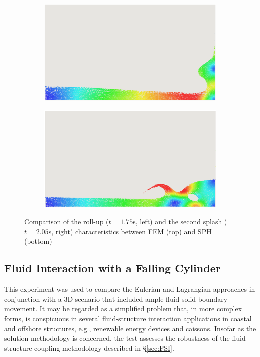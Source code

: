 \begin{figure}[H]
\begin{subfigure}{0.4\columnwidth}
	\end{subfigure}
	\begin{subfigure}{0.4\columnwidth}    
		\centering
		\includegraphics[width=1.0\textwidth]{images/FSI_Comparison/DB_SPH_1.png}
	\end{subfigure}
	\begin{subfigure}{0.4\columnwidth}
		\centering
		\includegraphics[width=1.0\textwidth]{images/FSI_Comparison/DB_SPH_2.png}
	\end{subfigure}
	\caption{Comparison of the roll-up ($t=1.75$\si{s}, left) and the second splash ($t=2.05$\si{s}, right) characteristics between FEM (top) and SPH (bottom)}    
	\label{fig:db_charac_fsi}
\end{figure}

\subsection{Fluid Interaction with a Falling Cylinder}
This experiment was used to compare the Eulerian and Lagrangian approaches in conjunction with a 3D scenario that included ample fluid-solid boundary movement. It may be regarded as a simplified problem that, in more complex forms, is conspicuous in several fluid-structure interaction applications in coastal and offshore structures, e.g., renewable energy devices and caissons. Insofar as the solution methodology is concerned, the test assesses the robustness of the fluid-structure coupling methodology described in
\S\ref{sec:FSI}. 


